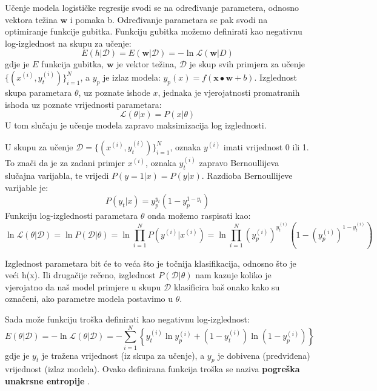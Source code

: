 \documentclass[times, utf8, diplomski, numeric]{fer}
\begin{document}
Učenje modela logističke regresije svodi se na određivanje parametera, odnosno vektora težina $\boldsymbol{w}$ i pomaka b. Određivanje parametara se pak svodi na optimiranje funkcije gubitka. Funkciju gubitka možemo definirati kao negativnu log-izglednost na skupu za učenje:
\begin{equation}
  E \left( h | \mathcal{D} \right) = E \left( \boldsymbol{w} | \mathcal{D} \right) = -\ln \mathcal{L} \left( \boldsymbol{w} | D \right)
\end{equation}
gdje je $E$ funkcija gubitka, $\boldsymbol{w}$ je vektor težina, $\mathcal{D}$ je skup svih primjera za učenje $\{ (x^{(i)}, y_t^{(i)}) \}_{i=1}^{N}$, a $y_p$ je izlaz modela: $y_p(x) = f(\boldsymbol{x} \bullet \boldsymbol{w} + b)$.
Izglednost skupa parametara $\theta$, uz poznate ishode $x$, jednaka je vjerojatnosti promatranih ishoda uz poznate vrijednosti parametara:
\begin{equation}
  \mathcal{L} ( \theta | x ) = P ( x | \theta )
\end{equation}
U tom slučaju je učenje modela zapravo maksimizacija log izglednosti.

U skupu za učenje $\mathcal{D} = \{ (x^{(i)}, y_t^{(i)}) \}_{i=1}^{N}$, oznaka $y^{(i)}$ imati vrijednost 0 ili 1. To znači da je za zadani primjer $x^{(i)}$, oznaka $y_t^{(i)}$ zapravo Bernoullijeva slučajna varijabla, te vrijedi $P(y = 1 | x) = P(y | x)$.
Razdioba Bernoullijeve varijable je:
\begin{equation}
  P \left( y_t | x \right) = y_p^{y_t} (1 - y_p^{1-y_t})
\end{equation}
Funkciju log-izglednosti parametara $\theta$ onda možemo raspisati kao:
\begin{equation}
  \ln \mathcal{L} (\theta | \mathcal{D}) = \ln P(\mathcal{D} | \theta ) = \ln \prod_{i=1}^{N} P(y^{(i)} | x^{(i)}) = \ln \prod_{i=1}^{N} (y_p^{(i)})^{y_t^{(i)}} \left( 1 - (y_p^{(i)})^{1-y_t^{(i)}} \right)
\end{equation}

Izglednost parametara bit će to veća što je točnija klasifikacija, odnosno što je veći h(x). Ili drugačije rečeno, izglednost $P(\mathcal{D} | \theta)$ nam kazuje koliko je vjerojatno da naš model primjere u skupu $\mathcal{D}$ klasificira baš onako kako su označeni, ako parametre modela postavimo u $\theta$.

Sada može funkciju troška definirati kao negativnu log-izglednost:
\begin{equation}
  E \left( \theta | \mathcal{D} \right) = -\ln \mathcal{L} (\theta | \mathcal{D}) = -\sum_{i=1}^{N} \left\{ y_t^{(i)} \ln y_p^{(i)} + \left( 1 - y_t^{(i)} \right) \ln (1 - y_p^{(i)}) \right\}
\end{equation}
gdje je $y_t$ je tražena vrijednost (iz skupa za učenje), a $y_p$ je dobivena (predviđena) vrijednost (izlaz modela).
Ovako definirana funkcija troška se naziva \textbf{pogreška unakrsne entropije} .
\end{document}
